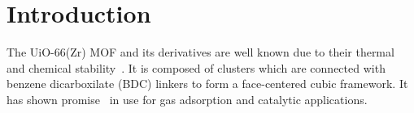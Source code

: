 
\section{Introduction}

The UiO-66(Zr) MOF and its derivatives are well known due to their thermal and chemical 
stability~\cite{cavkaNewZirconiumInorganic2008}. It is composed of
 clusters which are connected with benzene dicarboxilate (BDC) linkers to form
a face-centered cubic framework. It has shown promise~\cite{wiersumEvaluationUiO66GasBased2011}
in use for gas adsorption and catalytic applications.